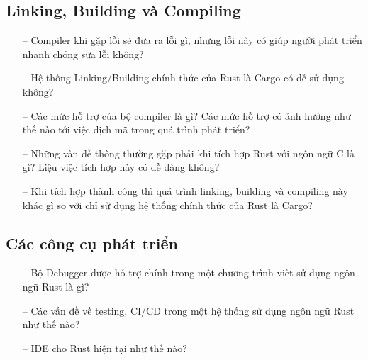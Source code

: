 \subsection{Linking, Building và Compiling}
\begin{itemize}
    \item[--]Compiler khi gặp lỗi sẽ đưa ra lỗi gì, những lỗi này có giúp người phát triển nhanh chóng sữa lỗi không?
    \item[--]Hệ thống Linking/Building chính thức của Rust là Cargo có dễ sử dụng không?
    \item[--]Các mức hỗ trợ của bộ compiler là gì? Các mức hỗ trợ có ảnh hưởng như thế nào tới việc dịch mã trong quá trình phát triển?
    \item[--]Những vấn đề thông thường gặp phải khi tích hợp Rust với ngôn ngữ C là gì? Liệu việc tích hợp này có dễ dàng không?
    \item[--]Khi tích hợp thành công thì quá trình linking, building và compiling này khác gì so với chỉ sử dụng hệ thống chính thức của Rust là Cargo?
\end{itemize}

\subsection{Các công cụ phát triển}
\begin{itemize}
    \item[--] Bộ Debugger được hỗ trợ chính trong một chương trình viết sử dụng ngôn ngữ Rust là gì?
    \item[--] Các vấn đề về testing, CI/CD trong một hệ thống sử dụng ngôn ngữ Rust như thế nào?
    \item[--] IDE cho Rust hiện tại như thế nào?
\end{itemize}

